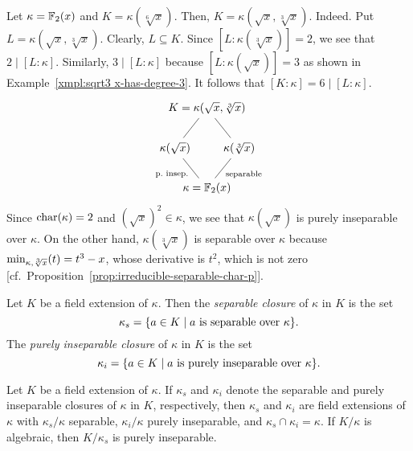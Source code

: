 \begin{xmpl}\label{xmpl:counterexample-sep-p.insep}
    Let $\kappa=\mathbb F_2(x)$ and $K=\kappa(\sqrt[6]x)$. Then, $K=\kappa(\sqrt x,\sqrt[3]x)$. Indeed. Put $L=\kappa(\sqrt x,\sqrt[3]x)$. Clearly, $L\subseteq K$. Since $[L:\kappa(\sqrt[3]x)]=2$, we see that $2\mid[L:\kappa]$. Similarly, $3\mid[L:\kappa]$ because $[L:\kappa(\sqrt x)]=3$ as shown in Example~\ref{xmpl:sqrt3 x-has-degree-3}. It follows that $[K:\kappa]=6\mid[L:\kappa]$.
    $$
        \begin{tikzcd}[column sep=-1cm]
                &{K=\kappa(\sqrt x,\sqrt[3]x)}\\
            \kappa(\sqrt x)
                    \arrow[ru,no head]
                &&{\kappa(\sqrt[3]x)}
                    \arrow[lu,no head]\\
                &\kappa=\F_2(x)
                    \arrow[lu,"\text{p.~insep.}",no head]
                    \arrow[ru,"\text{separable}"',no head]
        \end{tikzcd}
    $$
    Since $\operatorname{char}(\kappa)=2$ and $(\sqrt x)^2\in\kappa$, we see that $\kappa(\sqrt x)$ is purely inseparable over $\kappa$. On the other hand, $\kappa(\sqrt[3]x)$ is separable over $\kappa$ because $\operatorname{min}_{\kappa,\sqrt[3]x}(t)=t^3-x$, whose derivative is $t^2$, which is not zero [cf.~Proposition~\ref{prop:irreducible-separable-char-p}].
\end{xmpl}

\begin{defn}
    Let $K$ be a field extension of $\kappa$. Then the \textsl{separable closure} of $\kappa$ in $K$ is the set
    $$
        \kappa_s = \{a\in K\mid a\text{\rm\ is separable over }\kappa\}.
    $$
    The \textsl{purely inseparable closure} of $\kappa$ in $K$ is the set
    $$
        \kappa_i = \{a\in K\mid a\text{\rm\ is purely inseparable over }\kappa\}.
    $$
\end{defn}

\begin{thm}\label{thm:sep-and-p.insep-closures}
    Let\/ $K$ be a field extension of\/ $\kappa$. If\/ $\kappa_s$ and\/ $\kappa_i$ denote the separable and purely inseparable closures of\/ $\kappa$ in\/ $K$, respectively, then\/ $\kappa_s$ and\/ $\kappa_i$ are field extensions of\/ $\kappa$ with\/ $\kappa_s/\kappa$ separable, $\kappa_i / \kappa$ purely inseparable, and\/ $\kappa_s \cap \kappa_i = \kappa$. If\/ $K / \kappa$ is algebraic, then\/ $K / \kappa_s$ is purely inseparable.
\end{thm}

